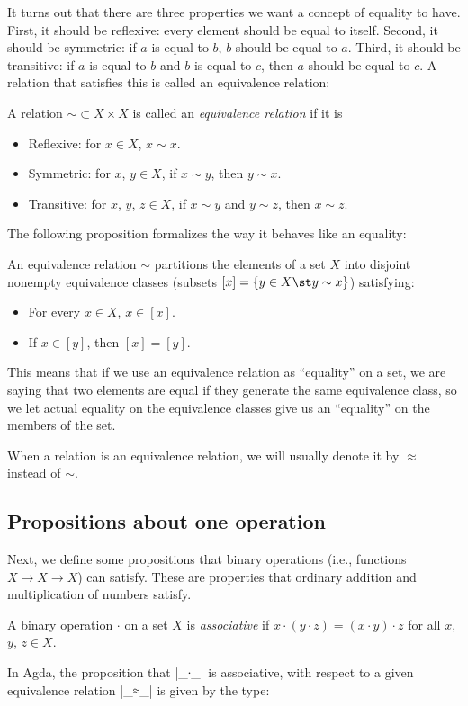 It turns out that there are three properties we want a concept of equality to have. First, it should be reflexive: every element should be equal to itself. Second, it should be symmetric: if $a$ is equal to $b$, $b$ should be equal to $a$. Third, it should be transitive: if $a$ is equal to $b$ and $b$ is equal to $c$, then $a$ should be equal to $c$. A relation that satisfies this is called an equivalence relation:
\begin{Definition}
  A relation $\mathbin{\sim} \subset X \times X$ is called an \emph{equivalence relation} if it is
  \begin{itemize}
  \item Reflexive: for $x \in X$, $x \sim x$.
  \item Symmetric: for $x$, $y \in X$, if $x \sim y$, then $y \sim x$.
  \item Transitive: for $x$, $y$, $z \in X$, if $x \sim y$ and $y \sim z$, then $x \sim z$.
  \end{itemize}
\end{Definition}
The following proposition formalizes the way it behaves like an equality:%
\begin{Proposition}
An equivalence relation $\sim$ partitions the elements of a set $X$ into disjoint nonempty equivalence classes (subsets $[x] = \{y \in X \st y \sim x\}$) satisfying: 
\begin{itemize}
\item For every $x \in X$, $x \in [x]$.
\item If $x \in [y]$, then $[x] = [y]$.
\end{itemize}
\end{Proposition}
This means that if we use an equivalence relation as ``equality'' on a set, we are saying that two elements are equal if they generate the same equivalence class, so we let actual equality on the equivalence classes give us an ``equality'' on the members of the set.

When a relation is an equivalence relation, we will usually denote it by $\approx$ instead of $\sim$.



\subsection{Propositions about one operation}
Next, we define some propositions that binary operations (i.e., functions $X \to X \to X$) can satisfy. These are properties that ordinary addition and multiplication of numbers satisfy.
\begin{Definition} %
A binary operation $\cdot$ on a set $X$ is \emph{associative} if $x \cdot (y \cdot z) = (x \cdot y) \cdot z$ for all $x$, $y$, $z \in X$.
\end{Definition}
In Agda, the proposition that |_∙_| is associative, with respect to a given equivalence relation |_≈_| is given by the type:

